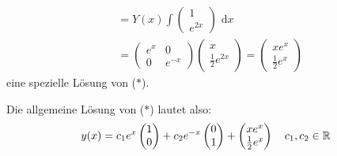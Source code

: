 \documentclass[a4paper,oneside,DIV15,BCOR12mm,chapterprefix=true,headings=onelinechapter]{scrbook}
\begin{document}
\begin{enumerate}
\begin{align*}
&= Y(x) \int \begin{pmatrix} 1 \\ e^{2x} \end{pmatrix}\text{ d}x\\ 
&=  \begin{pmatrix} e^x & 0 \\ 0 & e^{-x} \end{pmatrix} \begin{pmatrix} x \\ \frac12e^{2x} \end{pmatrix} = \begin{pmatrix} xe^x \\ \frac12e^x \end{pmatrix}
\end{align*}
eine spezielle Lösung von ($\ast$).

Die allgemeine Lösung von ($\ast$) lautet also: 
\[y(x) = c_1 e^x \begin{pmatrix} 1 \\ 0 \end{pmatrix} 
+ c_2 e^{-x} \begin{pmatrix} 0 \\ 1 \end{pmatrix}  
+ \begin{pmatrix} xe^x \\ \frac12e^x \end{pmatrix}\quad c_1, c_2 \in \mathbb{R}\]
\end{enumerate}
\end{document}
